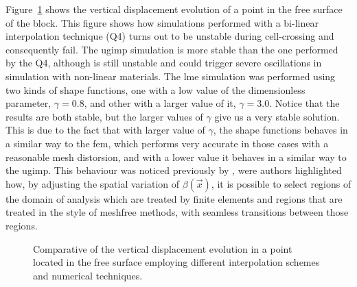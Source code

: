 \documentclass[preprint,12pt,a4paper]{elsarticle}
\begin{document}
Figure~\ref{fig:vertical-displacement-block} shows the vertical
displacement evolution of a point in the free surface of the
block. This figure shows how simulations performed with a bi-linear
interpolation technique (Q4) turns out to be unstable during
cell-crossing and consequently fail. The \acrshort{ugimp} simulation
is more stable than the one performed by the Q4, although is still
unstable and could trigger severe oscillations in simulation with
non-linear  materials. The \acrshort{lme} simulation was performed
using two kinds of shape functions, one with a low value of the
dimensionless parameter, $\gamma = 0.8$, and other with a larger value
of it, $\gamma = 3.0$. Notice that the results are both stable, but
the larger values of $\gamma$ give us a very stable solution. This is
due to the fact that with larger value of $\gamma$, the shape
functions behaves in a similar way to the \acrshort{fem}, which performs very
accurate in those cases with a reasonable mesh distorsion, and with a
lower value it behaves in a similar way to the \acrshort{ugimp}. This behaviour
was noticed previously by \cite{Arroyo2006}, were authors highlighted
how, by adjusting the spatial variation of $\beta(\vec{x})$, it is
possible to select regions of the domain of analysis which are treated
by finite elements and regions that are treated in the style of
meshfree methods, with seamless transitions between those regions. 
\begin{figure}
  \centering
  \caption{Comparative of the vertical displacement evolution in a
    point located in the free surface employing different
    interpolation schemes and numerical techniques.} 
  \label{fig:vertical-displacement-block}
\end{figure}
\end{document}

